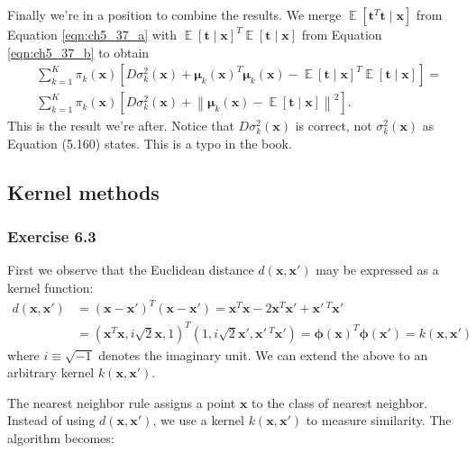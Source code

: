 \documentclass[12pt, a4paper]{article}
\newcommand{\vect}[1]{\bm{#1}}
\newcommand{\norm}[1]{\left\lVert#1\right\rVert}
\DeclareMathOperator{\E}{\mathbb{E}}
\begin{document}
\begin{easylist}[enumerate]
	Finally we're in a position to combine the results.
	We merge $\E \left[ \vect{t}^T \vect{t}\mid \vect{x} \right]$ from Equation \eqref{eqn:ch5_37_a} with $\E \left[ \vect{t} \mid \vect{x} \right]^T
	\E \left[ \vect{t} \mid \vect{x} \right]$ from Equation \eqref{eqn:ch5_37_b} to obtain
	\begin{align*}
	& \sum_{k=1}^{K} \pi_k (\vect{x})
	\left[
	 D \sigma_k^2(\vect{x}) + \vect{\mu}_k(\vect{x})^T \vect{\mu}_k(\vect{x}) - 
	\E \left[ \vect{t} \mid \vect{x} \right]^T
	\E \left[ \vect{t} \mid \vect{x} \right]
	 \right] = \\
	 &
	 \sum_{k=1}^{K} \pi_k (\vect{x})
	 \left[ D \sigma_k^2(\vect{x}) 
	 +
	 \norm{\vect{\mu}_k(\vect{x}) - \E \left[ \vect{t} \mid \vect{x} \right]}^2
	 \right].
	\end{align*}
	This is the result we're after.
	Notice that $D \sigma_k^2(\vect{x})$ is correct, not $ \sigma_k^2(\vect{x})$ as Equation (5.160) states.
	This is a typo in the book.
\end{easylist}


\subsection{Kernel methods}
\subsubsection*{Exercise 6.3}
First we observe that the Euclidean distance $d(\vect{x}, \vect{x}')$ may be expressed as a kernel function:
\begin{align*}
	d(\vect{x}, \vect{x}') &= (\vect{x} -  \vect{x}')^T (\vect{x} -  \vect{x}')
	= \vect{x}^T \vect{x} - 2 \vect{x}^T \vect{x}' + \vect{x}'\,^T \vect{x}'
	\\
	&= \left( \vect{x}^T \vect{x}, i \sqrt{2}\vect{x}, 1  \right)^T
	\left( 1, i \sqrt{2}\vect{x}', \vect{x}'\,^T \vect{x}'  \right)
	=
	\vect{\phi} \left( \vect{x} \right)^T \vect{\phi} \left( \vect{x}' \right)
	=
	k(\vect{x}, \vect{x}')
\end{align*}
where $i \equiv \sqrt{-1}$ denotes the imaginary unit.
We can extend the above to an arbitrary kernel $k(\vect{x}, \vect{x}')$.

The nearest neighbor rule assigns a point $\vect{x}$ to the class of nearest neighbor.
Instead of using $d(\vect{x}, \vect{x}')$, we use a kernel $k(\vect{x}, \vect{x}')$ to measure similarity. 
The algorithm becomes:
\end{document}
